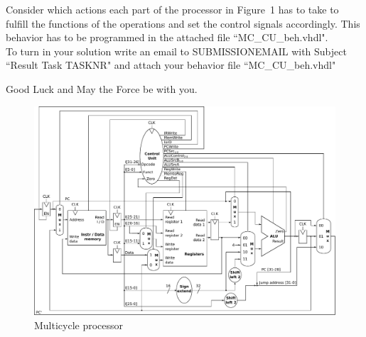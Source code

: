 \documentclass[a4paper,12pt]{article}
\begin{document}
Consider which actions each part of the processor in Figure~1 has to take to fulfill the functions of the operations and set the control signals accordingly. This behavior has to be programmed in the attached file ``MC\_CU\_beh.vhdl".\\


To turn in your solution write an email to {{SUBMISSIONEMAIL}} with Subject ``Result Task {{TASKNR}}" and attach your behavior file ``MC\_CU\_beh.vhdl"


\vspace{0.7cm}
Good Luck and May the Force be with you.

\begin{landscape}
\begin{figure}[!h]
\vspace{-1cm}
\hspace{-1.8cm}
\includegraphics[width=25.5cm]{../static/Multicycle_Processor_V_1_3} %
\caption{Multicycle processor}
\label{fig:MulticycleProcessor}
\end{figure}
\end{landscape}
\end{document}
